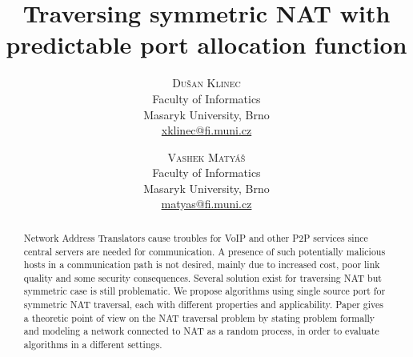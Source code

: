 \documentclass[twoside]{article}
\title{\vspace{-15mm}%
	\fontsize{24pt}{10pt}\selectfont
	\textbf{Traversing symmetric NAT with predictable port allocation function}
	}
\author{%
	\large
	\textsc{Du\v{s}an Klinec} \\[2mm]%
	\normalsize	Faculty of Informatics \\
	\normalsize	Masaryk University, Brno \\
	\normalsize	\href{mailto:xklinec@fi.muni.cz}{xklinec@fi.muni.cz}
	\and
	\textsc{Vashek Matyáš} \\[2mm]%
	\normalsize	Faculty of Informatics \\
	\normalsize	Masaryk University, Brno \\
	\normalsize	\href{mailto:matyas@fi.muni.cz}{matyas@fi.muni.cz}
	\vspace{-5mm}
	}
\date{}
\begin{document}
\maketitle
\thispagestyle{fancy}

\begin{abstract}
\noindent Network Address Translators cause troubles for VoIP and other P2P services since central servers are needed for communication.
A presence of such potentially malicious hosts in a communication path is not desired, mainly due to increased cost, poor link quality 
and some security consequences.
Several solution exist for traversing NAT but symmetric case is still problematic. We propose algorithms using single source port for 
symmetric NAT traversal, each with different properties and applicability. 
Paper gives a theoretic point of view on the NAT traversal problem by stating problem formally and modeling a network connected to 
NAT as a random process, in order to evaluate algorithms in a different settings.
% 
\end{abstract}
	
\end{document}

